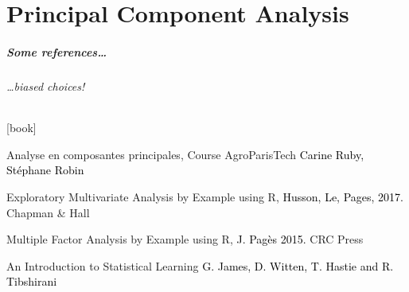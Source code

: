 \documentclass{beamer}\usepackage[]{graphicx}\usepackage[]{color}
\begin{document}
\part{Principal Component Analysis}
\begin{frame}
  \partpage
\end{frame}

\begin{frame}
  \frametitle{Some references\dots}
  \framesubtitle{\dots biased choices!}
  
    \begin{thebibliography}{99}
      [book]

     Analyse en composantes principales, \alert{Course AgroParisTech}
    \newblock \textcolor{black}{Carine Ruby, Stéphane Robin}

     Exploratory Multivariate Analysis by Example using R,
    \newblock \textcolor{black}{Husson, Le, Pages, 2017.}
    \newblock Chapman \& Hall

     Multiple Factor Analysis by Example using R,
    \newblock \textcolor{black}{J. Pagès 2015.}
    \newblock CRC Press

     An Introduction to Statistical Learning
    \newblock \textcolor{black}{G. James, D. Witten, T. Hastie and R. Tibshirani}

    \end{thebibliography}

\end{frame}
\end{document}
